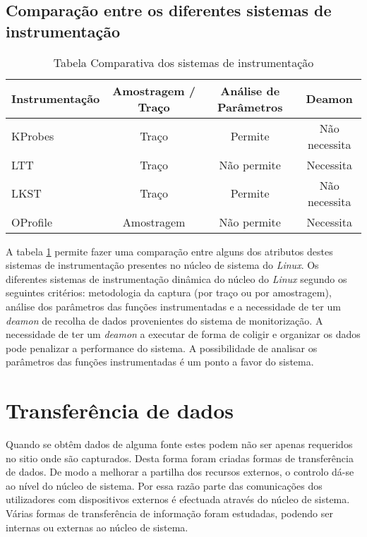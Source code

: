 
\subsection{Comparação entre os diferentes sistemas de instrumentação}
\begin{table}[h!]
\begin{center}
\begin{tabular}{|l||c|c|c|}
\hline
Instrumentação & Amostragem / Traço & Análise de Parâmetros & Deamon \\
\hline
KProbes & Traço & Permite & Não necessita \\
\hline
LTT & Traço & Não permite & Necessita \\
\hline
LKST & Traço & Permite & Não necessita \\
\hline
OProfile & Amostragem & Não permite & Necessita \\
\hline
\end{tabular}
\caption{Tabela Comparativa dos sistemas de instrumentação}
\label{tab:inst_compare}
\end{center}
\end{table}

A tabela \ref{tab:inst_compare} permite fazer uma comparação entre alguns dos atributos destes sistemas de instrumentação presentes no núcleo de sistema do \textit{Linux}.
Os diferentes sistemas de instrumentação dinâmica do núcleo do \textit{Linux} segundo os seguintes critérios: metodologia da captura (por traço ou por amostragem), análise dos parâmetros das funções instrumentadas e a necessidade de ter um \textit{deamon} de recolha de dados provenientes do sistema de monitorização.
A necessidade de ter um \textit{deamon} a executar de forma de coligir e organizar os dados pode penalizar a performance do sistema.
A possibilidade de analisar os parâmetros das funções instrumentadas é um ponto a favor do sistema. 

\section{Transferência de dados}\label{sect:kernel_user_comm}

Quando se obtêm dados de alguma fonte estes podem não ser apenas requeridos no sitio onde são capturados.
Desta forma foram criadas formas de transferência de dados.
De modo a melhorar a partilha dos recursos externos, o controlo dá-se ao nível do núcleo de sistema.
Por essa razão parte das comunicações dos utilizadores com dispositivos externos é efectuada através do núcleo de sistema.
Várias formas de transferência de informação foram estudadas, podendo ser internas ou externas ao núcleo de sistema.


